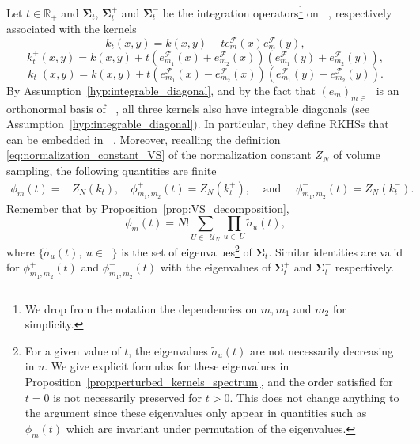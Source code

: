 \documentclass[twoside,11pt]{book}
\numberwithin{theorem}{chapter}
\numberwithin{definition}{chapter}
\numberwithin{proposition}{chapter}
\numberwithin{corollary}{chapter}
\numberwithin{example}{chapter}
\numberwithin{lemma}{chapter}
\DeclareMathOperator{\F}{\mathcal{F}}
\DeclareMathOperator{\X}{\mathcal{X}}
\DeclareMathOperator{\Ltwo}{\mathbb{L}_{2}(\mathrm{d} \omega)}
\DeclareMathOperator{\Ns}{\mathbb{N}^{*}}
\def\UN{\:\mathcal{U}_N}
\begin{document}
Let $t\in\mathbb{R}_{+}$ and $\bm{\Sigma}_{t}$, $\bm{\Sigma}_{t}^{+}$ and $\bm{\Sigma}_{t}^{-}$ be the integration operators\footnote{We drop from the notation the dependencies on $m,m_{1}$ and $m_{2}$ for simplicity.} on $\Ltwo$, respectively associated with the kernels
\begin{equation}\label{eq:k_t}
k_{t}(x,y) = k(x,y) + t e_{m}^{\F}(x) e_{m}^{\F}(y),
\end{equation}
\begin{equation}\label{eq:k_t_plus}
k_{t}^{+}(x,y) = k(x,y)
+ t \left( e_{m_{1}}^{\F}(x) + e_{m_{2}}^{\F}(x) \right) \left( e_{m_{1}}^{\F}(y) + e_{m_{2}}^{\F}(y) \right),
\end{equation}
\begin{equation}\label{eq:k_t_minus}
k_{t}^{-}(x,y) = k(x,y) + t \left( e_{m_{1}}^{\F}(x) - e_{m_{2}}^{\F}(x) \right) \left( e_{m_{1}}^{\F}(y) - e_{m_{2}}^{\F}(y) \right).
\end{equation}
By Assumption~\ref{hyp:integrable_diagonal}, and by the fact that $(e_{m})_{m \in \Ns}$ is an orthonormal basis of $\Ltwo$, all three kernels also have integrable diagonals (see Assumption~\ref{hyp:integrable_diagonal}).
In particular, they define RKHSs that can be embedded in $\Ltwo$. Moreover, recalling the definition \eqref{eq:normalization_constant_VS} of the normalization constant $Z_{N}$ of volume sampling, the following quantities are finite
\begin{align}
\phi_{m}(t) = & Z_{N}(k_{t}) , \quad\phi_{m_{1},m_{2}}^{+}(t) = Z_{N}(k_{t}^{+}),&\text{ and }\quad \phi_{m_{1},m_{2}}^{-}(t) = Z_{N}(k_{t}^{-}).
\end{align}
Remember that by Proposition~\ref{prop:VS_decomposition},
\begin{equation}\label{eq:Z_kt}
\phi_{m}(t) = N! \sum\limits_{U \in \: \UN} \prod\limits_{u \in \: U} \tilde{\sigma}_{u}(t),
\end{equation}
where $\displaystyle \{\tilde{\sigma}_{u}(t), \: u \in \Ns\}$ is the set of eigenvalues\footnote{For a given value of $t$, the eigenvalues $\tilde{\sigma}_{u}(t)$ are not necessarily decreasing in $u$. We give explicit formulas for these eigenvalues in Proposition~\ref{prop:perturbed_kernels_spectrum}, and the order satisfied for $t=0$ is not necessarily preserved for $t>0$. This does not change anything to the argument since these eigenvalues only appear in quantities such as $\phi_{m}(t)$ which are invariant under permutation of the eigenvalues.} of $\bm{\Sigma}_{t}$. Similar identities are valid for $\phi_{m_{1},m_{2}}^{+}(t)$ and $\phi_{m_{1},m_{2}}^{-}(t)$ with the eigenvalues of $\bm{\Sigma}_{t}^{+}$ and $\bm{\Sigma}_{t}^{-}$ respectively.
\end{document}
